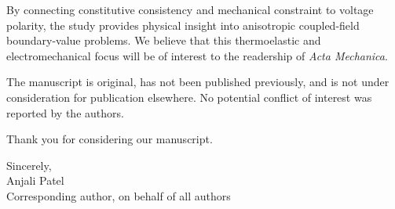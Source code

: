 \documentclass[11pt,a4paper]{article}
\begin{document}
By connecting constitutive consistency and mechanical constraint to voltage
polarity, the study provides physical insight into anisotropic coupled-field
boundary-value problems. We believe that this thermoelastic and electromechanical
focus will be of interest to the readership of \emph{Acta Mechanica}.

The manuscript is original, has not been published previously, and is not under
consideration for publication elsewhere. No potential conflict of interest was
reported by the authors.

Thank you for considering our manuscript.

Sincerely,\\[2pt]
Anjali Patel\\
Corresponding author, on behalf of all authors
\end{document}
